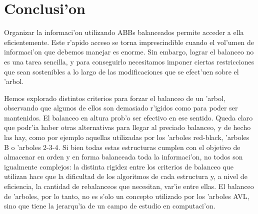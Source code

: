 \section{Conclusi'on}

Organizar la informaci'on utilizando ABBs balanceados permite acceder a ella eficientemente. Este r'apido acceso se torna imprescindible cuando el vol'umen de informaci'on que debemos manejar es enorme. Sin embargo, lograr el balanceo no es una tarea sencilla, y para conseguirlo necesitamos imponer ciertas restricciones que sean sostenibles a lo largo de las modificaciones que se efect'uen sobre el 'arbol.

Hemos explorado distintos criterios para forzar el balanceo de un 'arbol, observando que algunos de ellos son demasiado r'igidos como para poder ser mantenidos. El balanceo en altura prob'o ser efectivo en ese sentido. Queda claro que podr'ia haber otras alternativas para llegar al preciado balanceo, y de hecho las hay, como por ejemplo aquellas utilizadas por los 'arboles red-black, 'arboles B o 'arboles 2-3-4. Si bien todas estas estructuras cumplen con el objetivo de almacenar en orden y en forma balanceada toda la informaci'on, no todos son igualmente complejos: la distinta rigidez entre los criterios de balanceo que utilizan hace que la dificultad de los algoritmos de cada estructura y, a nivel de eficiencia, la cantidad de rebalanceos que necesitan, var'ie entre ellas. El balanceo de 'arboles, por lo tanto, no es s'olo un concepto utilizado por los 'arboles AVL, sino que tiene la jerarqu'ia de un campo de estudio en computaci'on.